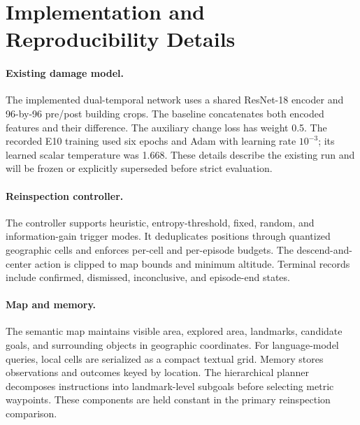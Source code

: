 \section{Implementation and Reproducibility Details}
\label{app:implementation}

\paragraph{Existing damage model.}
The implemented dual-temporal network uses a shared ResNet-18 encoder and 96-by-96 pre/post building crops.
The baseline concatenates both encoded features and their difference.
The auxiliary change loss has weight 0.5.
The recorded E10 training used six epochs and Adam with learning rate \(10^{-3}\); its learned scalar temperature was 1.668.
These details describe the existing run and will be frozen or explicitly superseded before strict evaluation.

\paragraph{Reinspection controller.}
The controller supports heuristic, entropy-threshold, fixed, random, and information-gain trigger modes.
It deduplicates positions through quantized geographic cells and enforces per-cell and per-episode budgets.
The descend-and-center action is clipped to map bounds and minimum altitude.
Terminal records include confirmed, dismissed, inconclusive, and episode-end states.

\paragraph{Map and memory.}
The semantic map maintains visible area, explored area, landmarks, candidate goals, and surrounding objects in geographic coordinates.
For language-model queries, local cells are serialized as a compact textual grid.
Memory stores observations and outcomes keyed by location.
The hierarchical planner decomposes instructions into landmark-level subgoals before selecting metric waypoints.
These components are held constant in the primary reinspection comparison.

